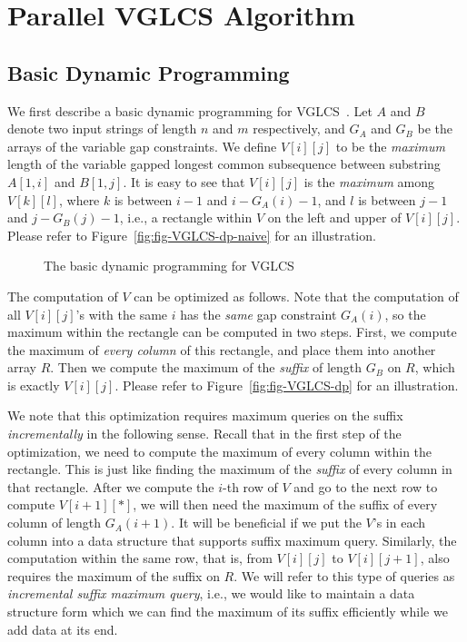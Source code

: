 \section{Parallel VGLCS Algorithm} \label{sec:parallelVGLCS}

\subsection{Basic Dynamic Programming}

We first describe a basic dynamic programming for
VGLCS~\cite{Peng2011TheLC}. Let $A$ and $B$ denote two input strings
of length $n$ and $m$ respectively, and $G_A$ and $G_B$ be the arrays
of the variable gap constraints.  We define $V[i][j]$ to be the {\em
  maximum} length of the variable gapped longest common subsequence
between substring $A[1, i]$ and $B[1, j]$.  It is easy to see that
$V[i][j]$ is the {\em maximum} among $V[k][l]$, where $k$ is between
$i-1$ and $i-G_A(i)-1$, and $l$ is between $j-1$ and $j-G_B(j)-1$,
i.e., a rectangle within $V$ on the left and upper of $V[i][j]$.
Please refer to Figure~\ref{fig:fig-VGLCS-dp-naive} for an
illustration.

\begin{figure}[!thb]
  \centering {} 
  \caption{The basic dynamic programming for VGLCS}
  \label{fig:basic-dp-VGLCS}
\end{figure}

The computation of $V$ can be optimized as follows.  Note that the
computation of all $V[i][j]$'s with the same $i$ has the {\em same} gap
constraint $G_A(i)$, so the maximum within the rectangle can be computed
in two steps.  First, we compute the maximum of {\em every column} of
this rectangle, and place them into another array $R$. Then we compute
the maximum of the {\em suffix} of length $G_B$ on $R$, which is exactly
$V[i][j]$.  Please refer to Figure~\ref{fig:fig-VGLCS-dp} for an
illustration.

We note that this optimization requires maximum queries on the suffix
{\em incrementally} in the following sense.  Recall that in the first
step of the optimization, we need to compute the maximum of every column
within the rectangle.  This is just like finding the maximum of the {\em
suffix} of every column in that rectangle.  After we compute the $i$-th
row of $V$ and go to the next row to compute $V[i+1][*]$, we will then
need the maximum of the suffix of every column of length $G_A(i+1)$. It
will be beneficial if we put the $V$'s in each column into a data
structure that supports suffix maximum query.  Similarly, the
computation within the same row, that is, from $V[i][j]$ to $V[i][j+1]$,
also requires the maximum of the suffix on $R$.  We will refer to this
type of queries as {\em incremental suffix maximum query}, i.e., we
would like to maintain a data structure form which we can find the
maximum of its suffix efficiently while we add data at its end.

